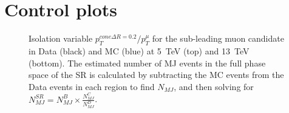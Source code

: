 
\section{Control plots}


\begin{figure}[h]
\centering
{}


\caption{Isolation variable $p_{T}^{cone \Delta R=0.2}/p_{T}^{\mu}$ for the sub-leading muon candidate in Data (black) and MC (blue) at 5~TeV (top) and 13~TeV (bottom). The estimated number of MJ events in the full phase space of the SR is calculated by subtracting the MC events from the Data events in each region to find $N_{MJ}$, and then solving for $N_{MJ}^{SR} = N_{MJ}^{B} \times \frac{N_{MJ}^{C}}{N_{MJ}^{D}}$.}
\label{f:Iso_Zmm}
\end{figure}